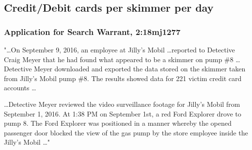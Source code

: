 \begin{comment}
\subsection{Skimmer residence time}
\label{sec:appendix:residencetime}

\subsubsection*{USA v. Rodriguez et al \cite{rodriguez}}
"\dots On or about April 4, 2016, Defendant ... installed a skimmer device on the point of sale terminal inside a gas pump located at a Circle K Gas Station in Fairview Park ... skimmer device was discovered on the gas pump by an employee on or about April 15, 2016 \dots

\dots On or about April 17, 2016, unknown members of the conspiracy installed a skimmer device on the point of sale terminal inside a gas pump at the Circle K Gas Station \dots skimmer was discovered by employees on or about April 19, 2016 \dots"

\subsubsection*{Application for Search Warrant, 2:18mj704 \cite{conde}}
"\dots (Victim \#1) whose debit card had been compromised and used at a Home Depot in an attempt to purchase a gift card \dots Victim \#1 stated he had only used that card once, on June 10, 2018, at the same gas station and pump where the skimmer device was recovered on June 21, 2018 \dots" 
\end{comment}
\subsection{Credit/Debit cards per skimmer per day}
\label{sec:appendix:cardsperskimmer}

\subsubsection*{Application for Search Warrant, 2:18mj1277 \cite{estrada}}
"\dots On September 9, 2016, an employee at Jilly's Mobil \dots reported to Detective Craig Meyer that he had found what appeared to be a skimmer on pump \#8 \dots Detective Meyer downloaded and exported the data stored on the skimmer taken from Jilly's Mobil pump \#8. The results showed data for 221 victim credit card accounts \dots

\dots Detective Meyer reviewed the video surveillance footage for Jilly's Mobil from September 1, 2016. At 1:38 PM on September 1st, a red Ford Explorer drove to pump 8. The Ford Explorer was positioned in a manner whereby the opened passenger door blocked the view of the gas pump by the store employee inside the Jilly's Mobil \dots"
